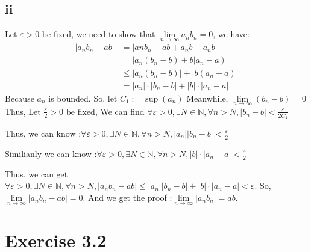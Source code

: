 \documentclass[11pt,twoside,a4paper]{article}
\begin{document}
\subsection{ii}
Let $\varepsilon>0$ be fixed, we need to show that $ \displaystyle\lim \limits_{n\to\infty}a_{n}b_{n}=0$, we have: 
\begin{align*}
|a_{n}b_{n}-a b| &=\left|{an} b_{n}-a b+a_{n} b-a_{n} b\right| \\
&\left.=\left|a_{n}\left(b_{n}-b\right)+b\right| a_{n}-a\right) \mid \\
& \leqslant\left|a_{n}\left(b_{n}-b\right)\right|+\left|b\left(a_{n}-a\right)\right| \\
&=\left|a_{n}\right| \cdot\left|b_{n}-b\right|+|b| \cdot\left|a_{n}-a\right|
\end{align*}
Because $a_{n}$ is bounded. So, let  $C_{1}:=\sup \left(a_{n}\right)$  Meanwhile,  $\lim \limits_{n\to\infty}(b_{n}-b)=0$  Thus, Let  $\displaystyle\frac{\varepsilon}{2}>0$  be fixed,
We can find  $\displaystyle\forall \varepsilon>0,  \exists N \in \mathbb{N}, \forall n>N,|b_{n}-b|<\frac{\varepsilon}{2C_{1}}$ 
\par\noindent
Thus, we can know :$\displaystyle\forall \varepsilon>0, \exists N \in \mathbb{N}, \forall n>N,\left|a_{n}\right| | b_{n}-b|<\frac{\varepsilon}{2} $
\par\noindent
Similianly we can know :$\displaystyle\forall \varepsilon>0,  \exists N \in \mathbb{N}, \forall n>N,|b| \cdot\left|a_{n}-a\right|<\frac{\varepsilon}{2}$
\par\noindent
Thus. we can get  $\forall \varepsilon>0, \exists N \in \mathbb{N}, \forall n>N, \left|a_{n} b_{n}-a b\right|\leq\left|a_{n}\right|\left|b_{n}-b\right|+|b| \cdot\left|a_{n}-a\right|<\varepsilon$. So,$ \displaystyle\lim \limits_{n\to\infty}\left|a_{n} b_{n}-a b\right|=0$. And we get the proof :$ \displaystyle\lim \limits_{n\to\infty}\left|a_{n} b_{n}\right|=ab$.






\section{Exercise 3.2}
\end{document}
